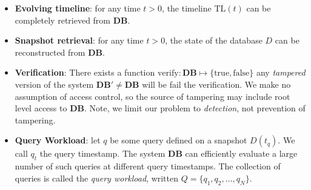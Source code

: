 \begin{itemize}
    \item {\bf Evolving timeline}: for any time $t > 0$, the timeline
        $\mathrm{TL}(t)$ can be completely retrieved from $\mathbf{DB}$.
    \item {\bf Snapshot retrieval}: for any time $t > 0$, the state of the
        database $D$ can be reconstructed from $\mathbf{DB}$.
    \item {\bf Verification}: There exists a function
        $\mathrm{verify}:\mathbf{DB}\mapsto\{\mathrm{true},\mathrm{false}\}$
        any {\em tampered} version of the system $\mathbf{DB}'\not=\mathbf{DB}$
        will be fail the verification.  We make no assumption of access control,
        so the source of tampering may include root level access to
        $\mathbf{DB}$.  Note, we limit our problem to {\em detection}, not
        prevention of tampering.
    \item {\bf Query Workload}: let $q$ be some query defined on a snapshot
        $D(t_q)$.  We call $q_t$ the query timestamp.  The system $\mathbf{DB}$
        can efficiently evaluate a large number of such queries at different
        query timestamps.  The collection of queries is called the {\em query
        workload}, written $Q = \{q_1, q_2, \dots, q_N\}$.
\end{itemize}
